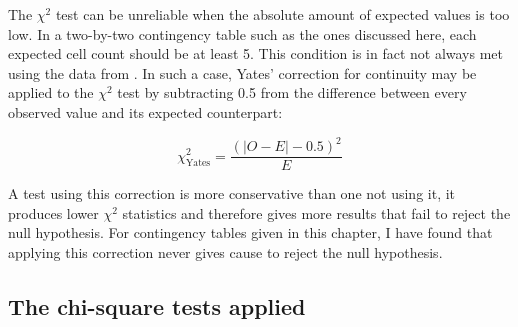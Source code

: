 


The \(\chi^2\) test can be unreliable when the absolute amount of expected values is too low. In a two-by-two contingency table such as the ones discussed here, each expected cell count should be at least 5. This condition is in fact not always met using the data from . In such a case, Yates' correction for continuity may be applied to the \(\chi^2\) test by subtracting 0.5 from the difference between every observed value and its expected counterpart:

\[\chi_\text{Yates}^2 =  \frac{(|O - E| - 0.5)^2}{E}\]

A test using this correction is more conservative than one not using it, \ie it produces lower \(\chi^2\) statistics and therefore gives more results that fail to reject the null hypothesis. For contingency tables given in this chapter, I have found that applying this correction never gives cause to reject the null hypothesis.


\subsection{The chi-square tests applied}
\label{sec:chisqapplied}

